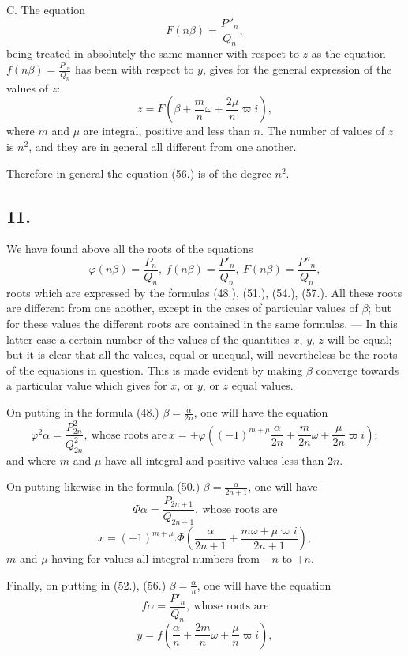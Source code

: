 \documentclass{article}
\begin{document}

C. The equation
\[ F(n\beta)=\frac{P''_n}{Q_n}, \tag{56.} \]
being treated in absolutely the same manner with respect to $z$ as the equation $f(n\beta)=\frac{P'_n}{Q_n}$ has been with respect to $y$, gives for the general expression of the values of $z$:
\[ z=F\left(\beta+\frac{m}{n}\omega+\frac{2\mu}{n}\varpi i\right), \tag{57.} \]
where $m$ and $\mu$ are integral, positive and less than $n$. The number of values of $z$ is $n^{2}$, and they are in general all different from one another.

Therefore in general the equation (56.) is of the degree $n^{2}$.

\subsection*{11.}

We have found above all the roots of the equations
\[ \varphi(n\beta)=\frac{P_n}{Q_n},\ f(n\beta)=\frac{P'_n}{Q_n},\ F(n\beta)=\frac{P''_n}{Q_n}, \]
roots which are expressed by the formulas (48.), (51.), (54.), (57.). All these roots are different from one another, except in the cases of particular values of $\beta$; but for these values the different roots are contained in the same formulas. --- In this latter case a certain number of the values of the quantities $x$, $y$, $z$ will be equal; but it is clear that all the values, equal or unequal, will nevertheless be the roots of the equations in question. This is made evident by making $\beta$ converge towards a particular value which gives for $x$, or $y$, or $z$ equal values.

On putting in the formula (48.) $\beta=\frac{\alpha}{2n}$, one will have the equation
\[ \varphi^{2}\alpha=\frac{P_{2n}^{2}}{Q_{2n}^{2}},\ \text{whose roots are}\ x=\pm\varphi\left((-1)^{m+\mu}\frac{\alpha}{2n}+\frac{m}{2n}\omega+\frac{\mu}{2n}\varpi i\right); \tag{58.} \]
and where $m$ and $\mu$ have all integral and positive values less than $2n$.

On putting likewise in the formula (50.) $\beta=\frac{\alpha}{2n+1}$, one will have
\[ \Phi\alpha=\frac{P_{2n+1}}{Q_{2n+1}},\ \text{whose roots are} \]
\[ x=(-1)^{m+\mu}.\Phi\left(\frac{\alpha}{2n+1}+\frac{m\omega+\mu\varpi i}{2n+1}\right), \tag{59.} \]
$m$ and $\mu$ having for values all integral numbers from $-n$ to $+n$.

Finally, on putting in (52.), (56.) $\beta=\frac{\alpha}{n}$, one will have the equation
\[ f\alpha=\frac{P'_n}{Q_n},\ \text{whose roots are} \]
\[ y=f\left(\frac{\alpha}{n}+\frac{2m}{n}\omega+\frac{\mu}{n}\varpi i\right), \tag{60.} \]
\end{document}
